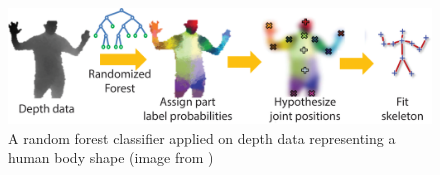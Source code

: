\begin{figure}[t]
\centering
    \includegraphics[width=1.0\columnwidth]{fig/img/kinect}
    \caption{
    A random forest classifier applied on depth data representing a human body shape (image from \cite{Fossati:2013:CDC}) }
    \label{fig:kinect}
\end{figure}


